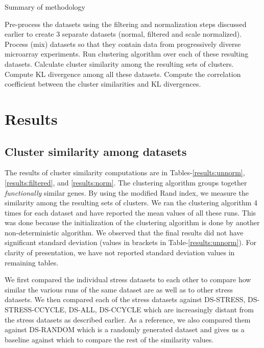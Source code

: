 \begin{algorithm}
\caption{Summary of methodology}
\label{alg:cluster_comparison}
\begin{algorithmic}[1]

\STATE Pre-process the datasets using the filtering and normalization steps discussed earlier to create 3 separate datasets (normal, filtered and scale normalized).
\STATE Process (mix) datasets so that they contain data from progressively diverse microarray experiments. 
\STATE Run clustering algorithm over each of these resulting datasets. 
\STATE Calculate cluster similarity among the resulting sets of clusters.
\STATE Compute \ac{KL} divergence among all these datasets.
\STATE Compute the correlation coefficient between the cluster similarities and \ac{KL} divergences.
\end{algorithmic}
\end{algorithm}

\section{Results}
\subsection{Cluster similarity among datasets}


The results of cluster similarity computations are in Tables-\ref{results:unnorm}, \ref{results:filtered}, and \ref{results:norm}. The clustering algorithm groups together \textit{functionally} similar genes. By using the modified Rand index, we measure the similarity among the resulting sets of clusters. We ran the clustering algorithm 4 times for each dataset and have reported the mean values of all these runs. This was done because the initialization of the clustering algorithm is done by another non-deterministic algorithm. We observed that the final results did not have significant standard deviation (values in brackets in Table-\ref{results:unnorm}). For clarity of presentation, we have not reported standard deviation values in remaining tables.

We first compared the individual stress datasets to each other to compare how similar the various runs of the same dataset are as well as to other stress datasets. We then compared each of the stress datasets against DS-STRESS, DS-STRESS-CCYCLE, DS-ALL, DS-CCYCLE which are increasingly distant from the stress datasets as described earlier. As a reference, we also compared them against DS-RANDOM which is a randomly generated dataset and gives us a baseline against which to compare the rest of the similarity values. 

